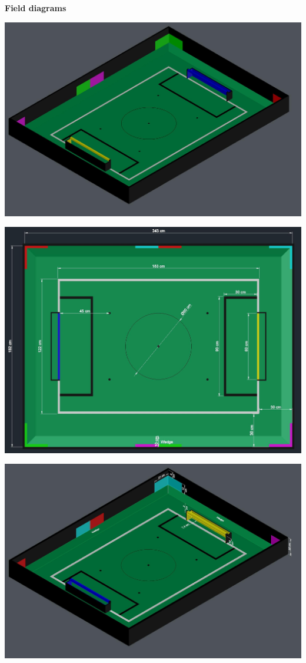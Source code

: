 \documentclass{article}
\begin{document}
\textbf{Field diagrams}

\includegraphics[width=1\textwidth]{media/image5.jpeg}

\includegraphics[width=1\textwidth]{media/image6.jpeg}

\includegraphics[width=1\textwidth]{media/image7.jpeg}
\end{document}
